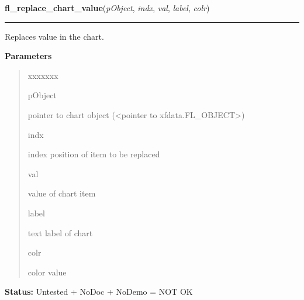 \hspace{.8\funcindent}\begin{boxedminipage}{\funcwidth}

    \raggedright \textbf{fl\_replace\_chart\_value}(\textit{pObject}, \textit{indx}, \textit{val}, \textit{label}, \textit{colr})

    \vspace{-1.5ex}

    \rule{\textwidth}{0.5\fboxrule}
\setlength{\parskip}{2ex}
    Replaces value in the chart.

\setlength{\parskip}{1ex}
      \textbf{Parameters}
      \vspace{-1ex}

      \begin{quote}
        \begin{Ventry}{xxxxxxx}

          \item[pObject]

          pointer to chart object ({\textless}pointer to 
          xfdata.FL\_OBJECT{\textgreater})

          \item[indx]

          index position of item to be replaced

          \item[val]

          value of chart item

          \item[label]

          text label of chart

          \item[colr]

          color value

        \end{Ventry}

      \end{quote}

\textbf{Status:} Untested + NoDoc + NoDemo = NOT OK



    \end{boxedminipage}

    \label{xformslib:library:fl_set_chart_bounds}

    \vspace{0.5ex}

